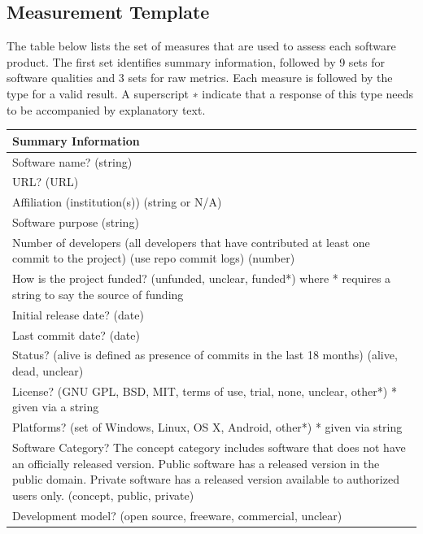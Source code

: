 \documentclass[12pt, notitlepage]{article}
\begin{document}
\begin{singlespace}
\begin{enumerate}
\end{enumerate}

\newpage

\subsection{Measurement Template}\label{measurementtemplate2}
The table below lists the set of measures that are used to assess each software product. The first set identifies summary information, followed by 9 sets for software qualities and 3 sets for raw metrics. Each measure is followed by the type for a valid result. A superscript ∗ indicate that a response of this type needs to be accompanied by explanatory text. 

\label{measurementtemplate}
\def\arraystretch{1.22}
\begin{tabular}{p{16cm}}
		\hline
		\textbf{Summary Information}\\
		\hline
		Software name? (string)\\
		URL? (URL)\\
		Affiliation (institution(s)) (string or {N/A})\\
		Software purpose (string)\\
		Number of developers (all developers that have contributed at least one commit to the project) (use repo commit logs) (number)\\
		How is the project funded? (unfunded, unclear, funded*) where * requires a string to say the source of funding\\
		Initial release date? (date)\\
		Last commit date? (date)\\
		Status? (alive is defined as presence of commits in the last 18 months) ({alive, dead, unclear})\\
		License? ({GNU GPL, BSD, MIT, terms of use, trial, none, unclear, other*}) * given via a string \\
		Platforms? (set of {Windows, Linux, OS X, Android, other*}) * given via string\\
		Software Category? The concept category includes software that does not have an officially released version. Public software has a released version in the public domain. Private software has a released version available to authorized users only. ({concept, public, private})\\
		Development model? ({open source, freeware, commercial, unclear})\\

\end{tabular}
\end{singlespace}
\end{document}
